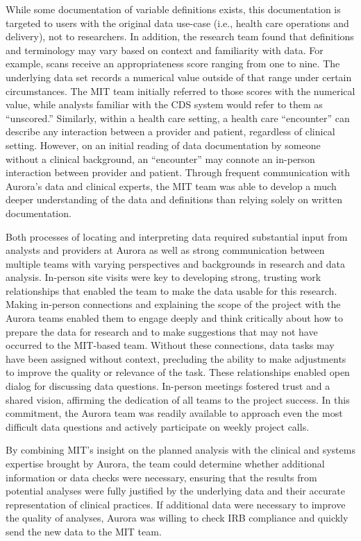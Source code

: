 While some documentation of variable definitions exists, this documentation is targeted to users with the original data use-case (i.e., health care operations and delivery), not to researchers. In addition, the research team found that definitions and terminology may vary based on context and familiarity with data. For example, scans receive an appropriateness score ranging from one to nine. The underlying data set records a numerical value outside of that range under certain circumstances. The MIT team initially referred to those scores with the numerical value, while analysts familiar with the CDS system would refer to them as ``unscored.'' Similarly, within a health care setting, a health care ``encounter'' can describe any interaction between a provider and patient, regardless of clinical setting. However, on an initial reading of data documentation by someone without a clinical background, an ``encounter'' may connote an in-person interaction between provider and patient. Through frequent communication with Aurora's data and clinical experts, the MIT team was able to develop a much deeper understanding of the data and definitions than relying solely on written documentation.

Both processes of locating and interpreting data required substantial input from analysts and providers at Aurora as well as strong communication between multiple teams with varying perspectives and backgrounds in research and data analysis. In-person site visits were key to developing strong, trusting work relationships that enabled the team to make the data usable for this research. Making in-person connections and explaining the scope of the project with the Aurora teams enabled them to engage deeply and think critically about how to prepare the data for research and to make suggestions that may not have occurred to the MIT-based team. Without these connections, data tasks may have been assigned without context, precluding the ability to make adjustments to improve the quality or relevance of the task. These relationships enabled open dialog for discussing data questions. In-person meetings fostered trust and a shared vision, affirming the dedication of all teams to the project success. In this commitment, the Aurora team was readily available to approach even the most difficult data questions and actively participate on weekly project calls.

By combining MIT's insight on the planned analysis with the clinical and systems expertise brought by Aurora, the team could determine whether additional information or data checks were necessary, ensuring that the results from potential analyses were fully justified by the underlying data and their accurate representation of clinical practices. If additional data were necessary to improve the quality of analyses, Aurora was willing to check IRB compliance and quickly send the new data to the MIT team.

